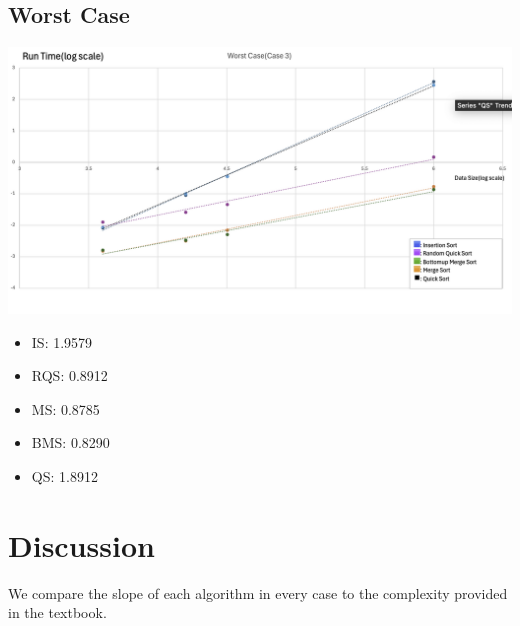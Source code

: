 \documentclass[11pt]{article}
\theoremstyle{definition}
\begin{document}
\subsection*{Worst Case}
\includegraphics[width = \textwidth]{Chart 3.png}
\begin{itemize}
  \item IS: 1.9579
  \item RQS: 0.8912
  \item MS: 0.8785 
  \item BMS: 0.8290
  \item QS: 1.8912
\end{itemize}
\newpage
\section*{Discussion}
We compare the slope of each algorithm in every case to the complexity provided in the textbook. 
\end{document}
